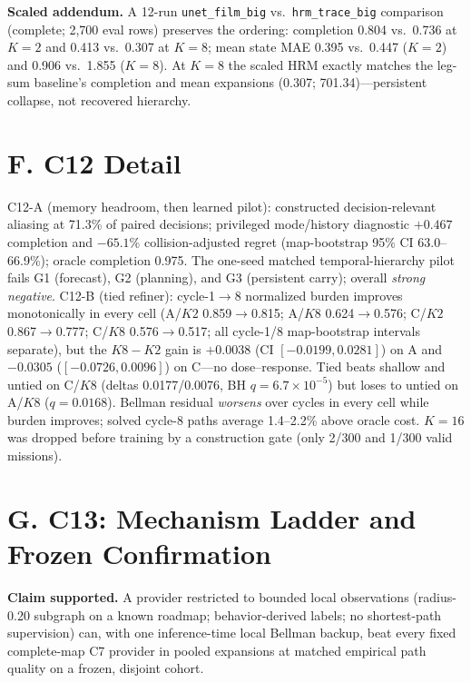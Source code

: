 \documentclass[letterpaper]{article} %
\newcommand{\stage}[1]{\textsc{#1}}
\begin{document}
\textbf{Scaled addendum.} A 12-run \texttt{unet\_film\_big} vs.\ \texttt{hrm\_trace\_big} comparison (complete; 2{,}700 eval rows) preserves the ordering: completion 0.804 vs.\ 0.736 at $K{=}2$ and 0.413 vs.\ 0.307 at $K{=}8$; mean state MAE 0.395 vs.\ 0.447 ($K{=}2$) and 0.906 vs.\ 1.855 ($K{=}8$). At $K{=}8$ the scaled HRM exactly matches the leg-sum baseline's completion and mean expansions (0.307; 701.34)---persistent collapse, not recovered hierarchy.

\section{F. \stage{C12} Detail}

\stage{C12-A} (memory headroom, then learned pilot): constructed decision-relevant aliasing at 71.3\% of paired decisions; privileged mode/history diagnostic $+0.467$ completion and $-65.1$\% collision-adjusted regret (map-bootstrap 95\% CI 63.0--66.9\%); oracle completion 0.975. The one-seed matched temporal-hierarchy pilot fails G1 (forecast), G2 (planning), and G3 (persistent carry); overall \emph{strong negative}. \stage{C12-B} (tied refiner): cycle-1$\to$8 normalized burden improves monotonically in every cell (A/$K2$ 0.859$\to$0.815; A/$K8$ 0.624$\to$0.576; C/$K2$ 0.867$\to$0.777; C/$K8$ 0.576$\to$0.517; all cycle-1/8 map-bootstrap intervals separate), but the $K8{-}K2$ gain is $+0.0038$ (CI $[-0.0199, 0.0281]$) on A and $-0.0305$ ($[-0.0726, 0.0096]$) on C---no dose--response. Tied beats shallow and untied on C/$K8$ (deltas 0.0177/0.0076, BH $q{=}6.7{\times}10^{-5}$) but loses to untied on A/$K8$ ($q{=}0.0168$). Bellman residual \emph{worsens} over cycles in every cell while burden improves; solved cycle-8 paths average 1.4--2.2\% above oracle cost. $K{=}16$ was dropped before training by a construction gate (only 2/300 and 1/300 valid missions).

\section{G. C13: Mechanism Ladder and Frozen Confirmation}

\textbf{Claim supported.} A provider restricted to bounded local observations (radius-0.20 subgraph on a known roadmap; behavior-derived labels; no shortest-path supervision) can, with one inference-time local Bellman backup, beat every fixed complete-map \stage{C7} provider in pooled expansions at matched empirical path quality on a frozen, disjoint cohort.
\end{document}

